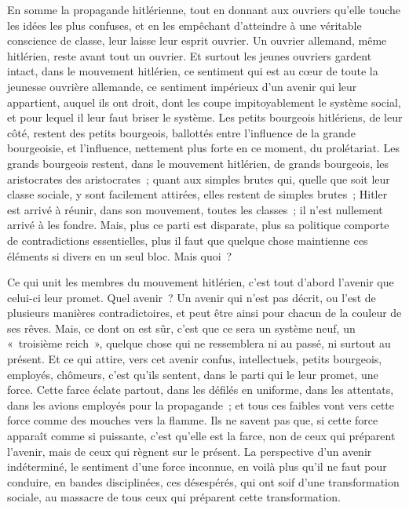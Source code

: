 \documentclass[french,twoside]{book} %
\begin{document}
En somme la propagande hitlérienne, tout en donnant aux ouvriers qu'elle touche les idées les plus confuses, et en les empêchant d'atteindre à une véri­table conscience de classe, leur laisse leur esprit ouvrier. Un ouvrier allemand, même hitlérien, reste avant tout un ouvrier. Et surtout les jeunes ouvriers gardent intact, dans le mouvement hitlérien, ce sentiment qui est au cœur de toute la jeunesse ouvrière allemande, ce sentiment impérieux d'un avenir qui leur appartient, auquel ils ont droit, dont les coupe impitoyablement le système social, et pour lequel il leur faut briser le système. Les petits bou­rgeois hitlériens, de leur côté, restent des petits bourgeois, ballottés entre l'influence de la grande bourgeoisie, et l'influence, nettement plus forte en ce moment, du prolétariat. Les grands bourgeois restent, dans le mouvement hitlérien, de grands bourgeois, les aristocrates des aristocrates ; quant aux simples brutes qui, quelle que soit leur classe sociale, y sont facilement attirées, elles restent de simples brutes ; Hitler est arrivé à réunir, dans son mouvement, toutes les classes ; il n'est nullement arrivé à les fondre. Mais, plus ce parti est disparate, plus sa politique comporte de contradictions essen­tielles, plus il faut que quelque chose maintienne ces éléments si divers en un seul bloc. Mais quoi ?\par
Ce qui unit les membres du mouvement hitlérien, c'est tout d'abord l'avenir que celui-ci leur promet. Quel avenir ? Un avenir qui n'est pas décrit, ou l'est de plusieurs manières contradictoires, et peut être ainsi pour chacun de la couleur de ses rêves. Mais, ce dont on est sûr, c'est que ce sera un système neuf, un « troisième reich », quelque chose qui ne ressemblera ni au passé, ni surtout au présent. Et ce qui attire, vers cet avenir confus, intellectuels, petits bourgeois, employés, chômeurs, c'est qu'ils sentent, dans le parti qui le leur promet, une force. Cette farce éclate partout, dans les défilés en uniforme, dans les attentats, dans les avions employés pour la propagande ; et tous ces faibles vont vers cette force comme des mouches vers la flamme. Ils ne savent pas que, si cette force apparaît comme si puissante, c'est qu'elle est la farce, non de ceux qui préparent l'avenir, mais de ceux qui règnent sur le présent. La perspective d'un avenir indéterminé, le sentiment d'une force inconnue, en voilà plus qu'il ne faut pour conduire, en bandes disciplinées, ces désespérés, qui ont soif d'une transformation sociale, au massacre de tous ceux qui préparent cette transformation.\par
\end{document}
